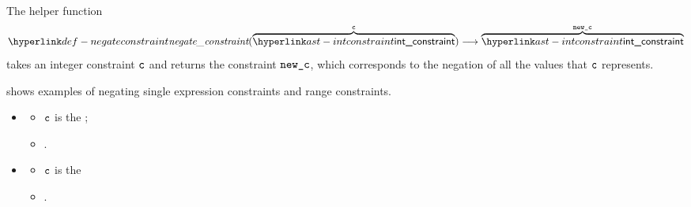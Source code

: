 \begin{mathpar}
\end{mathpar}

\begin{mathpar}
\end{mathpar}

\begin{mathpar}
\end{mathpar}

\begin{mathpar}
\end{mathpar}

\hypertarget{def-negateconstraint}{}
The helper function
\[
  \negateconstraint(\overname{\intconstraint}{\vc}) \aslto \overname{\intconstraint}{\newc}
\]
takes an integer constraint $\vc$ and returns the constraint $\newc$,
which corresponds to the negation of all the values that $\vc$ represents.

 shows examples of negating single expression
constraints and range constraints.

\ProseParagraph
\OneApplies
\begin{itemize}
  \item {}
  \begin{itemize}
    \item $\vc$ is the \Proseexactconstraint{$\ve$};
    \item {}.
  \end{itemize}

  \item {}
  \begin{itemize}
    \item $\vc$ is the \Proserangeconstraint{$\vstart$}{$\vend$}
    \item {}.
  \end{itemize}
\end{itemize}

